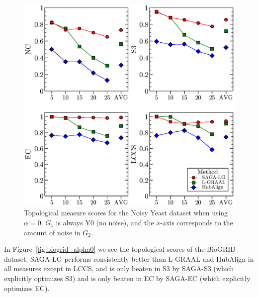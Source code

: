 \documentclass{bioinfo}
\begin{document}
\begin{figure}
\centering
\includegraphics[width=0.99\linewidth]{syntheticyeast_bw.eps}
\caption{Topological measure scores for the Noisy Yeast dataset when using $\alpha=0$. $G_1$ is always Y0 (no noise), and the $x$-axis corresponds to the amount of noise in $G_2$.}
\label{fig:syntheticyeast}
\end{figure}

In Figure~\ref{fig:biogrid_alpha0} we see the topological scores of the BioGRID dataset. SAGA-LG performs consistently better than L-GRAAL and HubAlign in all measures except in LCCS, and is only beaten in S3 by SAGA-S3 (which explicitly optimizes S3) and is only beaten in EC by SAGA-EC (which explicitly optimizes EC).
\end{document}

